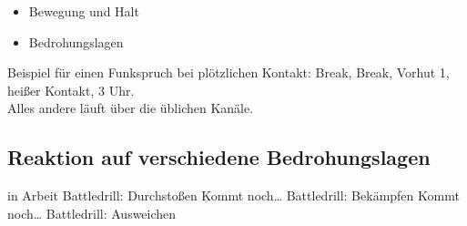 	\begin{itemize}
		\item Bewegung und Halt 
		\item Bedrohungslagen
	\end{itemize}

	Beispiel für einen Funkspruch bei plötzlichen Kontakt: Break, Break, Vorhut 1, heißer Kontakt, 3 Uhr. \\
	Alles andere läuft über die üblichen Kanäle. \\

\subsection{Reaktion auf verschiedene Bedrohungslagen}
in Arbeit
Battledrill: Durchstoßen
Kommt noch…
Battledrill: Bekämpfen
Kommt noch…
Battledrill: Ausweichen

